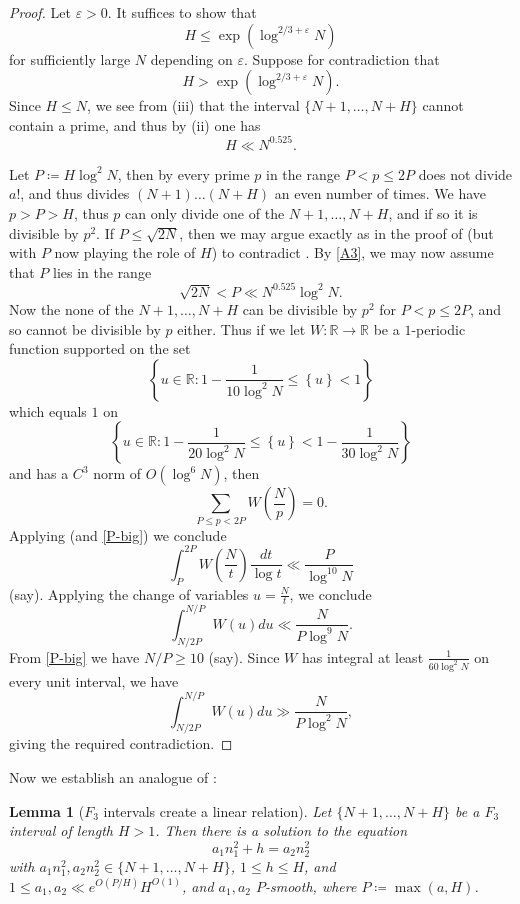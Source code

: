 \documentclass[12pt]{amsart}
\newtheorem{lemma}[theorem]{Lemma}
\newcommand{\eps}{\varepsilon}
\newcommand{\R}{\mathbb{R}}
\begin{document}
\begin{proof}  Let $\eps > 0$.  It suffices to show that
$$ H \leq \exp(\log^{2/3+\eps} N)$$
for sufficiently large $N$ depending on $\eps$.  Suppose for contradiction that
$$ H > \exp(\log^{2/3+\eps} N).$$
Since $H \leq N$, we see from (iii) that the interval $\{N+1,\dots,N+H\}$ cannot contain a prime, and thus by (ii) one has
\begin{equation}\label{A3}
        H \ll N^{0.525}.
\end{equation}

Let $P \coloneqq H \log^2 N$, then by  every prime $p$ in the range $P < p \leq 2P$ does not divide $a!$, and thus divides $(N+1) \dots (N+H)$ an even number of times.  We have $p > P > H$, thus $p$ can only divide one of the $N+1,\dots,N+H$, and if so it is divisible by $p^2$.
 If $P \leq \sqrt{2N}$, then we may argue exactly as in the proof of  (but with $P$ now playing the role of $H$) to contradict .  By \eqref{A3}, we may now assume that $P$ lies in the range
 \begin{equation}\label{P-big}
    \sqrt{2N} < P \ll N^{0.525} \log^2 N.
 \end{equation}
Now the none of the $N+1, \dots, N+H$ can be divisible by $p^2$ for $P < p \leq 2P$, and so cannot be divisible by $p$ either.  Thus if we let $W \colon \R \to \R$ be a $1$-periodic function supported on the set
$$ \left\{ u \in \R : 1-\frac{1}{10\log^2 N} \leq \left\{ u \right\} < 1 \right\}$$
which equals $1$ on
$$ \left\{ u \in \R : 1-\frac{1}{20\log^2 N} \leq \left\{ u \right\} < 1- \frac{1}{30 \log^2 N} \right\}$$
and has a $C^3$ norm of $O(\log^6 N)$, then
$$ \sum_{P \leq p < 2P} W\left(\frac{N}{p}\right) = 0.$$
Applying  (and \eqref{P-big}) we conclude
$$ \int_P^{2P} W\left(\frac{N}{t}\right) \frac{dt}{\log t} \ll \frac{P}{\log^{10} N}$$
(say).  Applying the change of variables $u = \frac{N}{t}$, we conclude
$$  \int_{N/2P}^{N/P} W\left(u\right) du \ll \frac{N}{P \log^{9} N}.$$
From \eqref{P-big} we have $N/P \geq 10$ (say).  Since $W$ has integral at least $\frac{1}{60 \log^2 N}$ on every unit interval, we have
$$  \int_{N/2P}^{N/P} W\left(u\right) du \gg \frac{N}{P \log^2 N},$$
giving the required contradiction.
\end{proof}

Now we establish an analogue of :

\begin{lemma}[$F_3$ intervals create a linear relation]\label{linrel-f3}  Let $\{N+1,\dots,N+H\}$ be a $F_3$ interval of length $H > 1$.  Then there is a solution to the equation
    $$ a_1 n_1^2 + h = a_2 n_2^2$$
    with $a_1 n_1^2, a_2 n_2^2 \in \{ N+1, \dots, N+H\}$, $1 \leq h \leq H$, and $1 \leq a_1, a_2 \ll e^{O(P/H)} H^{O(1)}$, and $a_1,a_2$ $P$-smooth, where $P \coloneqq \max(a,H)$.
\end{lemma}
\end{document}

